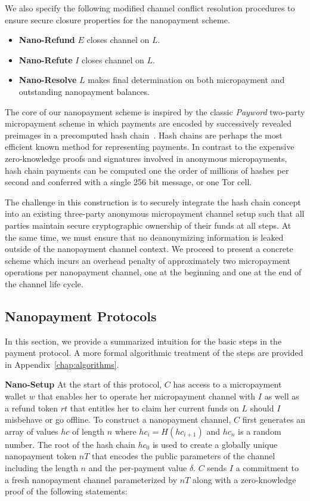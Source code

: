 We also specify the following modified channel conflict resolution procedures to
ensure secure closure properties for the nanopayment scheme.

\begin{itemize}
\item \textbf{Nano-Refund} $E$ closes channel on $L$.
\item \textbf{Nano-Refute} $I$ closes channel on $L$.
\item \textbf{Nano-Resolve} $L$ makes final determination on both micropayment and
  outstanding nanopayment balances.
\end{itemize}

The core of our nanopayment scheme is inspired by the classic \emph{Payword}
two-party micropayment scheme in which payments are encoded by successively
revealed preimages in a precomputed hash chain~\cite{rivest1996payword}. Hash
chains are perhaps the most efficient known method for representing payments. In
contrast to the expensive zero-knowledge proofs and signatures involved in
anonymous micropayments, hash chain payments can be computed one the order of
millions of hashes per second and conferred with a single 256 bit message, or
one Tor cell.

The challenge in this construction is to securely integrate the hash chain
concept into an existing three-party anonymous micropayment channel setup such
that all parties maintain secure cryptographic ownership of their funds at all
steps. At the same time, we must ensure that no deanonymizing information is
leaked outside of the nanopayment channel context. We proceed to present a
concrete scheme which incurs an overhead penalty of approximately two
micropayment operations per nanopayment channel, one at the beginning and one at
the end of the channel life cycle.

\subsection{Nanopayment Protocols}
In this section, we provide a summarized intuition for the basic steps in the
payment protocol. A more formal algorithmic treatment of the steps are provided
in Appendix~\ref{chap:algorithms}.

\textbf{Nano-Setup} At the start of this protocol, $C$ has access to a
micropayment wallet $w$ that enables her to operate her micropayment channel
with $I$ as well as a refund token $rt$ that entitles her to claim her current
funds on $L$ should $I$ misbehave or go offline. To construct a nanopayment
channel, $C$ first generates an array of values $hc$ of length $n$ where
$hc_i = H(hc_{i+1})$ and $hc_n$ is a random number. The root of the hash chain
$hc_0$ is used to create a globally unique nanopayment token $nT$ that encodes
the public parameters of the channel including the length $n$ and the
per-payment value $\delta$. $C$ sends $I$ a commitment to a fresh nanopayment
channel parameterized by $nT$ along with a zero-knowledge proof of the following
statements:


